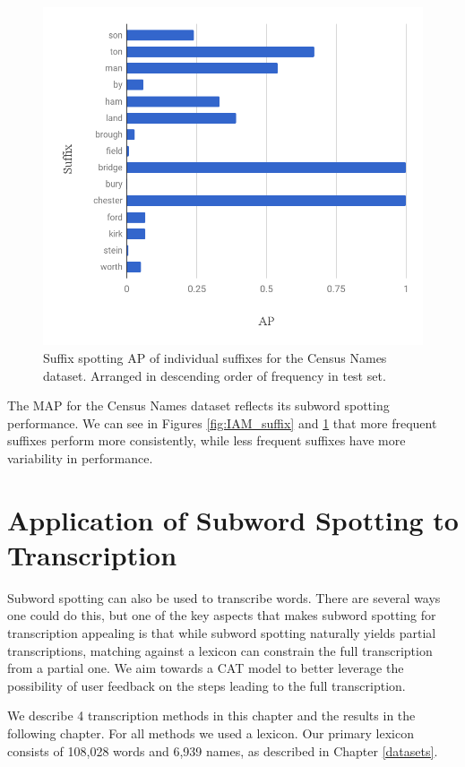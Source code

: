 \documentclass[ms,electronic,twosidetoc,letterpaper,chaptercenter,parttop,lol,lof,lot]{byumsphd}
\begin{document}
\begin{figure}
    \centering
    \includegraphics[width=.75\textwidth]{suffix_names_ap}
    \caption{Suffix spotting AP of individual suffixes for the Census Names dataset. Arranged in descending order of frequency in test set.}
    \label{fig:names_suffix}
\end{figure}

The MAP for the Census Names dataset reflects its subword spotting performance. We can see in Figures \ref{fig:IAM_suffix} and \ref{fig:names_suffix} that more frequent suffixes perform more consistently, while less frequent suffixes have more variability in performance.




\chapter{Application of Subword Spotting to Transcription}\label{transcription}

Subword spotting can also be used to transcribe words. There are several ways one could do this, but one of the key aspects that makes subword spotting for transcription appealing is that while subword spotting naturally yields partial transcriptions, matching against a lexicon can constrain the full transcription from a partial one. We aim towards a CAT model to better leverage the possibility of user feedback on the steps leading to the full transcription.

We describe 4 transcription methods in this chapter and the results in the following chapter.
For all methods we used a lexicon. Our primary lexicon consists of 108,028 words and 6,939 names, as described in Chapter \ref{datasets}.
\end{document}
